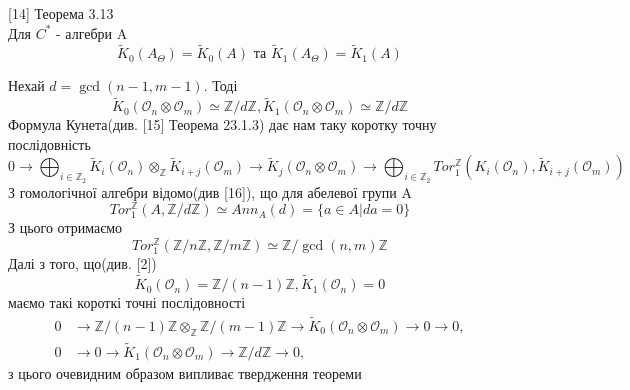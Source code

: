 \begin{proposition}{[14] Теорема 3.13} \\
    Для $C^*$ - алгебри A
    \begin{equation*}
        \widetilde{K}_0(A_\Theta) = \widetilde{K}_0(A) \text{ та } \widetilde{K}_1(A_\Theta) = \widetilde{K}_1(A)
    \end{equation*}
\end{proposition}

\begin{theorem}
    Нехай $d = \gcd(n - 1, m - 1)$.
    Тоді
    \begin{equation*}
        \widetilde{K}_0(\mathcal{O}_n \otimes \mathcal{O}_m) \simeq \mathbb{Z}/d\mathbb{Z},
        \widetilde{K}_1(\mathcal{O}_n \otimes \mathcal{O}_m) \simeq \mathbb{Z}/d\mathbb{Z}
    \end{equation*}
    Формула Кунета(див. [15] Теорема 23.1.3) дає нам таку коротку точну
    \\ послідовність
    \begin{equation*}
        0
        \to \bigoplus_{i \in \mathbb{Z}_2} \widetilde{K}_i(\mathcal{O}_n) \otimes_{\mathbb{Z}} \widetilde{K}_{i+j}(\mathcal{O}_m)
        \to \widetilde{K}_j(\mathcal{O}_n \otimes \mathcal{O}_m)
        \to \bigoplus_{i \in \mathbb{Z}_2} Tor_1^{\mathbb{Z}}(K_i(\mathcal{O}_n), \widetilde{K}_{i+j}(\mathcal{O}_m))
    \end{equation*}
    З гомологічної алгебри відомо(див [16]), що для абелевої групи A
    \begin{equation*}
        Tor_1^{\mathbb{Z}}(A, \mathbb{Z}/d\mathbb{Z}) \simeq Ann_A(d) = \{a \in A | da = 0\}
    \end{equation*}
    З цього отримаємо
    \begin{equation*}
        Tor_1^{\mathbb{Z}}(\mathbb{Z}/n\mathbb{Z}, \mathbb{Z}/m\mathbb{Z}) \simeq \mathbb{Z}/\gcd(n,m)\mathbb{Z}
    \end{equation*}
    Далі з того, що(див. [2])
    \begin{equation*}
        \widetilde{K}_0(\mathcal{O}_n) = \mathbb{Z}/(n-1)\mathbb{Z},
        \widetilde{K}_1(\mathcal{O}_n) = 0
    \end{equation*}
    маємо такі короткі точні послідовності
    \begin{align*}
        0
        &\to \mathbb{Z}/(n-1)\mathbb{Z} \otimes_{\mathbb{Z}} \mathbb{Z}/(m-1)\mathbb{Z}
        \to \widetilde{K}_0(\mathcal{O}_n \otimes \mathcal{O}_m)
        \to 0
        \to 0, \\
        0
        &\to 0
        \to \widetilde{K}_1(\mathcal{O}_n \otimes \mathcal{O}_m)
        \to \mathbb{Z}/d\mathbb{Z}
        \to 0,
    \end{align*}
    з цього очевидним образом випливає твердження теореми
\end{theorem}

